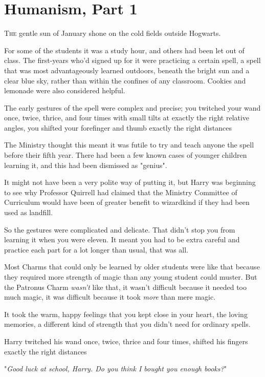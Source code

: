 \chapter{Humanism, Part 1}

\lettrine{T}{he} gentle sun of
January shone on the cold fields outside Hogwarts.

For some of the students it was a study hour, and others had been let out of
class. The first-years who'd signed up for it were practicing a certain spell,
a spell that was most advantageously learned outdoors, beneath the bright sun
and a clear blue sky, rather than within the confines of any classroom. Cookies
and lemonade were also considered helpful.

The early gestures of the spell were complex and precise; you twitched your
wand once, twice, thrice, and four times with small tilts at exactly the right
relative angles, you shifted your forefinger and thumb exactly the right
distances{\el}

The Ministry thought this meant it was futile to try and teach anyone the spell
before their fifth year. There had been a few known cases of younger children
learning it, and this had been dismissed as "genius".

It might not have been a very polite way of putting it, but Harry was beginning
to see why Professor Quirrell had claimed that the Ministry Committee of
Curriculum would have been of greater benefit to wizardkind if they had been
used as landfill.

So the gestures were complicated and delicate. That didn't stop you from
learning it when you were eleven. It meant you had to be extra careful and
practice each part for a lot longer than usual, that was all.

Most Charms that could only be learned by older students were like that because
they required more strength of magic than any young student could muster. But
the Patronus Charm \emph{wasn't} like that, it wasn't difficult because it
needed too much magic, it was difficult because it took \emph{more} than mere
magic.

It took the warm, happy feelings that you kept close in your heart, the loving
memories, a different kind of strength that you didn't need for ordinary spells.

Harry twitched his wand once, twice, thrice and four times, shifted his fingers
exactly the right distances{\el}

"\emph{Good luck at school, Harry. Do you think I bought you enough books?}"

